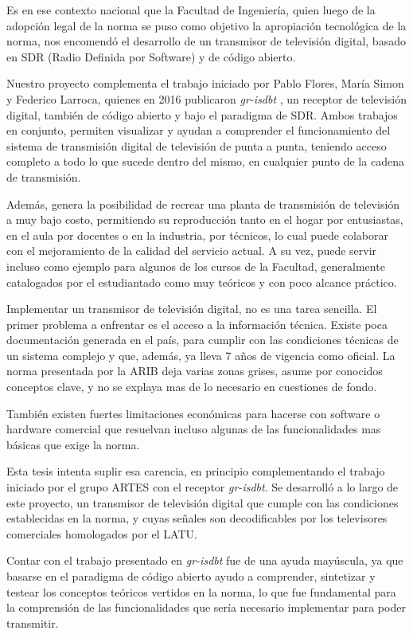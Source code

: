 Es en ese contexto nacional que la Facultad de Ingeniería, quien luego de la adopción legal de la norma se puso como objetivo la apropiación tecnológica de la norma, nos encomendó el desarrollo de un transmisor de televisión digital, basado en SDR (Radio Definida por Software) y de código abierto.

Nuestro proyecto complementa el trabajo iniciado por Pablo Flores, María Simon y Federico Larroca, quienes en 2016 publicaron \textit{gr-isdbt} \cite{gr-isdbt}, un receptor de televisión digital, también de código abierto y bajo el paradigma de SDR. Ambos trabajos en conjunto, permiten visualizar y ayudan a comprender el funcionamiento del sistema de transmisión digital de televisión de punta a punta, teniendo acceso completo a todo lo que sucede dentro del mismo, en cualquier punto de la cadena de transmisión. 

Además, genera la posibilidad de recrear una planta de transmisión de televisión a muy bajo costo, permitiendo su reproducción tanto en el hogar por entusiastas, en el aula por docentes o en la industria, por técnicos, lo cual puede colaborar con el mejoramiento de la calidad del servicio actual. A su vez, puede servir incluso como ejemplo para algunos de los cursos de la Facultad, generalmente catalogados por el estudiantado como muy teóricos y con poco alcance práctico. 

Implementar un transmisor de televisión digital, no es una tarea sencilla. El primer problema a enfrentar es el acceso a la información técnica. Existe poca documentación generada en el país, para cumplir con las condiciones técnicas de un sistema complejo y que, además, ya lleva 7 años de vigencia como oficial. La norma presentada por la ARIB deja varias zonas grises, asume por conocidos conceptos clave, y no se explaya mas de lo necesario en cuestiones de fondo. 

También existen fuertes limitaciones económicas para hacerse con software o hardware comercial que resuelvan incluso algunas de las funcionalidades mas básicas que exige la norma. 

Esta tesis intenta suplir esa carencia, en principio complementando el trabajo iniciado por el grupo ARTES con el receptor \textit{gr-isdbt}. Se desarrolló a lo largo de este proyecto, un transmisor de televisión digital que cumple con las condiciones establecidas en la norma, y cuyas señales son decodificables por los televisores comerciales homologados por el LATU.

Contar con el trabajo presentado en \textit{gr-isdbt} fue de una ayuda mayúscula, ya que basarse en el paradigma de código abierto ayudo a comprender, sintetizar y testear los conceptos teóricos vertidos en la norma, lo que fue fundamental para la comprensión de las funcionalidades que sería necesario implementar para poder transmitir. 

